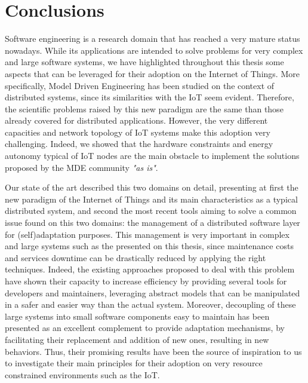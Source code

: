 \chapter{Conclusions}
\label{sec:Conclusions}
Software engineering is a research domain that has reached a very mature status nowadays.
While its applications are intended to solve problems for very complex and large software systems, we have highlighted throughout this thesis some aspects that can be leveraged for their adoption on the Internet of Things.
More specifically, Model Driven Engineering has been studied on the context of distributed systems, since its similarities with the IoT seem evident.
Therefore, the scientific problems raised by this new paradigm are the same than those already covered for distributed applications.
However, the very different capacities and network topology of IoT systems make this adoption very challenging.
Indeed, we showed that the hardware constraints and energy autonomy typical of IoT nodes are the main obstacle to implement the solutions proposed by the MDE community \textit{"as is"}.

Our state of the art described this two domains on detail, presenting at first the new paradigm of the Internet of Things and its main characteristics as a typical distributed system, and second the most recent tools aiming to solve a common issue found on this two domains: the management of a distributed software layer for (self)adaptation purposes.
This management is very important in complex and large systems such as the presented on this thesis, since maintenance costs and services downtime can be drastically reduced by applying the right techniques.
Indeed, the existing approaches proposed to deal with this problem have shown their capacity to increase efficiency by providing several tools for developers and maintainers, leveraging abstract models that can be manipulated in a safer and easier way than the actual system.
Moreover, decoupling of these large systems into small software components easy to maintain has been presented as an excellent complement to provide adaptation mechanisms, by facilitating their replacement and addition of new ones, resulting in new behaviors.
Thus, their promising results have been the source of inspiration to us to investigate their main principles for their adoption on very resource constrained environments such as the IoT.

